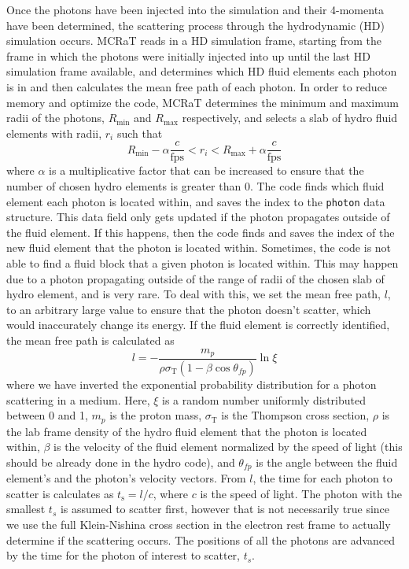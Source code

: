 \documentclass[12pt,a4paper]{article}
\begin{document}
Once the photons have been injected into the simulation and their 4-momenta have been determined, the scattering process through the hydrodynamic (HD) simulation occurs. MCRaT reads in a HD simulation frame, starting from the frame in which the photons were initially injected into up until the last HD simulation frame available, and determines which HD fluid elements each photon is in and then calculates the mean free path of each photon. In order to reduce memory and optimize the code, MCRaT determines the minimum and maximum radii of the photons, $R_\mathrm{min}$ and $R_\mathrm{max}$ respectively, and selects a slab of hydro fluid elements with radii, $r_i$ such that 
\[
R_\mathrm{min}-\alpha\frac{c}{\mathrm{fps}} < r_i < R_\mathrm{max}+\alpha\frac{c}{\mathrm{fps}} 
\] 
where $\alpha$ is a multiplicative factor that can be increased to ensure that the number of chosen hydro elements is greater than 0. The code finds which fluid element each photon is located within, and saves the index to the \texttt{photon} data structure. This data field only gets updated if the photon propagates outside of the fluid element. If this happens, then the code finds and saves the index of the new fluid element that the photon is located within. Sometimes, the code is not able to find a fluid block that a given photon is located within. This may happen due to a photon propagating outside of the range of radii of the chosen slab of hydro element, and is very rare. To deal with this, we set the mean free path, $l$, to an arbitrary large value to ensure that the photon doesn't scatter, which would inaccurately change its energy. If the fluid element is correctly identified, the mean free path is calculated as  
\[
l=-\frac{m_p}{\rho\sigma_\mathrm{T}(1-\beta\cos\theta_{fp})}\ln\xi
\]
where we have inverted the exponential probability distribution for a photon scattering in a medium. Here, $\xi$ is a random number uniformly distributed between 0 and 1, $m_p$ is the proton mass, $\sigma_\mathrm{T}$ is the Thompson cross section, $\rho$ is the lab frame density of the hydro fluid element that the photon is located within, $\beta$ is the velocity of the fluid element normalized by the speed of light (this should be already done in the hydro code), and $\theta_{fp}$ is the angle between the fluid element's and the photon's velocity vectors. From $l$, the time for each photon to scatter is calculates as $t_\mathrm{s}=l/c$, where $c$ is the speed of light. The photon with the smallest $t_s$ is assumed to scatter first, however that is not necessarily true since we use the full Klein-Nishina cross section in the electron rest frame to actually determine if the scattering occurs. The positions of all the photons are advanced by the time for the photon of interest to scatter, $t_s$.
\end{document}
